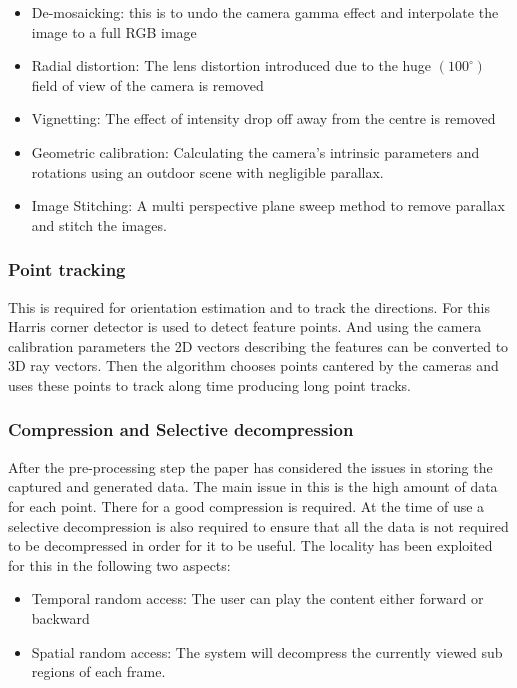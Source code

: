 \begin{itemize}
\item De-mosaicking: this is to undo the camera gamma effect and interpolate the image to a full RGB image
\item Radial distortion: The lens distortion introduced due to the huge $(100^{\circ})$ field of view of the camera is removed
\item Vignetting: The effect of intensity drop off away from the centre is removed
\item Geometric calibration: Calculating the camera's intrinsic parameters and rotations using an outdoor scene with negligible parallax.
\item Image Stitching: A multi perspective plane sweep method to remove parallax and stitch the images.
\end{itemize}

\subsubsection{Point tracking}
This is required for orientation estimation and to track the directions. For this Harris corner detector is used to detect feature points. And using the camera calibration parameters the 2D vectors describing the features can be converted to 3D ray vectors. Then the algorithm chooses points cantered by the cameras and uses these points to track along time producing long point tracks.

\subsubsection{Compression and Selective decompression}

After the pre-processing step the paper has considered the issues in storing the captured and generated data. The main issue in this is the high amount of data for each point. There for a good compression is required.
At the time of use a selective decompression is also required to ensure that all the data is not required to be decompressed in order for it to be useful.
The locality has been exploited for this in the following two aspects:
\begin{itemize}
\item Temporal random access: The user can play the content either forward or backward
\item Spatial random access: The system will decompress the currently viewed sub regions of each frame.
\end{itemize}

